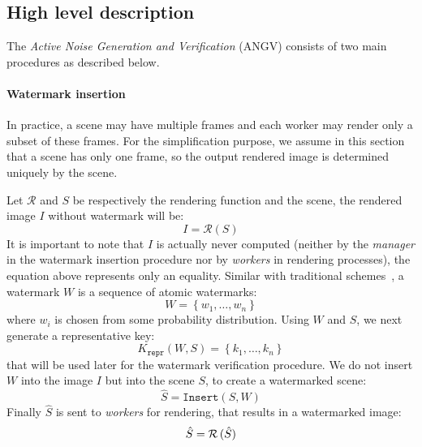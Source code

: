 \documentclass[a4paper,11pt,onecolumn]{memoir}
\begin{document}
\subsection[Hight level description]{High level description}
The \emph{Active Noise Generation and Verification} (ANGV) consists of two main procedures as described below.

\paragraph[Watermark insertion]{Watermark insertion}
In practice, a scene may have multiple frames and each worker may render only a subset of these frames. For the simplification purpose, we assume in this section that a scene has only one frame, so the output rendered image is determined uniquely by the scene.

Let $\mathcal{R}$ and $S$ be respectively the rendering function and the scene, the rendered image $I$ without watermark will be:
\begin{equation*}
    I = \mathcal{R} \left( S \right)
\end{equation*}
It is important to note that $I$ is actually never computed (neither by the \emph{manager} in the watermark insertion procedure nor by \emph{workers} in rendering processes), the equation above represents only an equality. Similar with traditional schemes~\cite{Cox1999,Cox1997}, a watermark $W$ is a sequence of atomic watermarks:
\begin{equation*}
    W = \left\{ w_1,\dots,w_n \right\}
\end{equation*}
where $w_i$ is chosen from some probability distribution. Using $W$ and $S$, we next generate a representative key:
\begin{equation*}
    K_{\mathtt{repr}} \left(W,S\right) = \left\{ k_1,\dots,k_n \right\}
\end{equation*}
that will be used later for the watermark verification procedure. We do not insert $W$ into the image $I$ but into the scene $S$, to create a watermarked scene:
\begin{equation*}
    \hat{S} = \mathtt{Insert} \left(S, W\right)
\end{equation*}
Finally $\hat{S}$ is sent to \emph{workers} for rendering, that results in a watermarked image:
\begin{equation*}
    \hat{S} = \mathcal{R} \thinspace (\hat{S})
\end{equation*}
\end{document}
